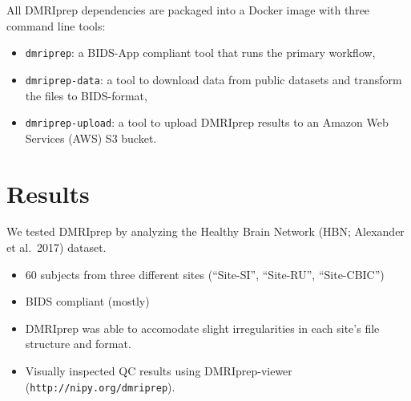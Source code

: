 \documentclass[a0, landscape]{a0poster}
\begin{document}
\begin{multicols}{3}
\vfill
\columnbreak

\noindent All DMRIprep dependencies are packaged into a Docker image with three command line tools:
\begin{itemize}
    \item \texttt{dmriprep}: a BIDS-App compliant tool that runs the primary workflow,
    \item \texttt{dmriprep-data}: a tool to download data from public datasets and transform the files to BIDS-format,
    \item \texttt{dmriprep-upload}: a tool to upload DMRIprep results to an Amazon Web Services (AWS) S3 bucket.
\end{itemize}

\color{Navy}


\section*{Results}

\noindent We tested DMRIprep by analyzing the Healthy Brain Network (HBN; Alexander et al.~2017) dataset.
\begin{itemize}
    \item 60 subjects from three different sites (``Site-SI'', ``Site-RU'', ``Site-CBIC'')
    \item BIDS compliant (mostly)
    \item DMRIprep was able to accomodate slight irregularities in each site's file structure and format.
    \item Visually inspected QC results using DMRIprep-viewer (\texttt{http://nipy.org/dmriprep}).
\end{itemize}


\end{multicols}
\end{document}
